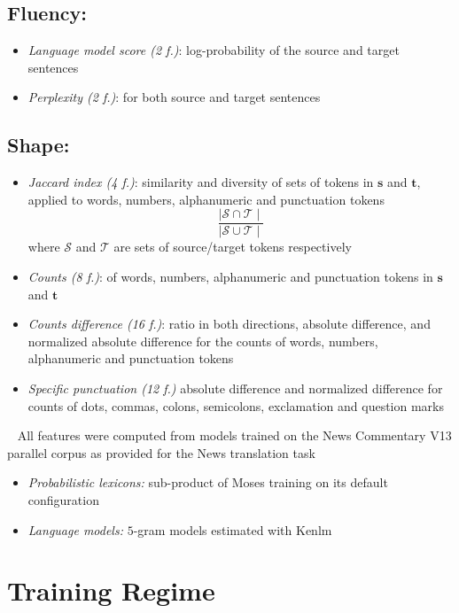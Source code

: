 \documentclass[a0]{sciposter}
\begin{document}
\begin{multicols*}{2}
\subsection*{Fluency:} 
\begin{itemize}
  \item \textit{Language model score (2 f.)}: log-probability of the source and target sentences
  \item \textit{Perplexity (2 f.)}: for both source and target sentences
\end{itemize}

\subsection*{Shape:}
\begin{itemize}
  \item \textit{Jaccard index (4 f.)}: similarity and diversity of sets of tokens in $\mathbf{s}$ and $\mathbf{t}$, applied to words, numbers, alphanumeric and punctuation tokens
  $$ \frac{\mid \mathcal{S}\cap \mathcal{T}\mid}{\mid \mathcal{S}\cup \mathcal{T}\mid}$$
  where $\mathcal{S}$ and $\mathcal{T}$ are sets of source/target tokens respectively
  \item \textit{Counts (8 f.)}: of words, numbers, alphanumeric and punctuation tokens in $\mathbf{s}$ and $\mathbf{t}$
  \item \textit{Counts difference (16 f.)}: ratio in both directions, absolute difference, and normalized absolute difference for the counts of words, numbers, alphanumeric and punctuation tokens
  \item \textit{Specific punctuation (12 f.)} absolute difference and normalized difference for counts of dots, commas, colons, semicolons, exclamation and question marks
\end{itemize}

~\newline
All features were computed from models trained on the News Commentary V13 parallel corpus as provided for the News translation task
\begin{itemize}
  \item \textit{Probabilistic lexicons:} sub-product of Moses training on its default configuration
  \item \textit{Language models:} $5$-gram models estimated with Kenlm
\end{itemize}


\section*{\Large Training Regime}

\end{multicols*}
\end{document}
